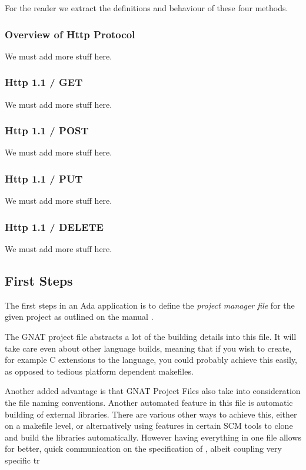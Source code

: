 For the reader we extract the definitions and behaviour of these four methods.
\subsubsection{Overview of Http Protocol}
We must add more stuff here.

\subsubsection{Http 1.1 / GET}
We must add more stuff here.

\subsubsection{Http 1.1 / POST}
We must add more stuff here.

\subsubsection{Http 1.1 / PUT}
We must add more stuff here.

\subsubsection{Http 1.1 / DELETE} 
We must add more stuff here.

\subsection{First Steps}
The first steps in an Ada application is to define the \textit{project manager 
file} for the given project as outlined on the manual \cite{GNATintro}.

The GNAT project file abstracts a lot of the building details into this file.
It will take care even about other language builds, meaning that if you wish
to create, for example C extensions to the language, you could probably achieve
this easily, as opposed to tedious platform dependent makefiles. 

Another added advantage is that GNAT Project Files also take into consideration 
the file naming conventions. Another automated feature in this file is automatic
building of external libraries. There are various other ways to achieve this,
either on a makefile level, or alternatively using features in certain SCM tools
to clone and build the libraries automatically. However having everything in one
file allows for better, quick communication on the specification of ,
albeit coupling very specific tr

